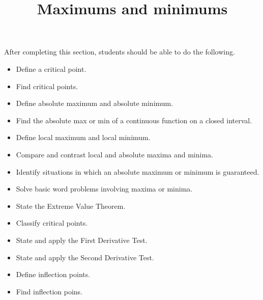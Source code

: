 \documentclass{ximera}
\title{Maximums and minimums}
\begin{document}
\begin{abstract}
\end{abstract}

\maketitle

\begin{sectionOutcomes}

After completing this section, students should be able to do the following.

\begin{itemize}
	\item Define a critical point.
	\item Find critical points.
	\item Define absolute maximum and absolute minimum.
	\item Find the absolute max or min of a continuous function on a closed interval.
	\item Define local maximum and local minimum.
	\item Compare and contrast local and absolute maxima and minima.
	\item Identify situations in which an absolute maximum or minimum is guaranteed.
	\item Solve basic word problems involving maxima or minima.
	\item State the Extreme Value Theorem.
	\item Classify critical points.
	\item State and apply the First Derivative Test.
	\item State and apply the Second Derivative Test.
	\item Define inflection points.
	\item Find inflection poins.
\end{itemize}

\end{sectionOutcomes}
\end{document}
